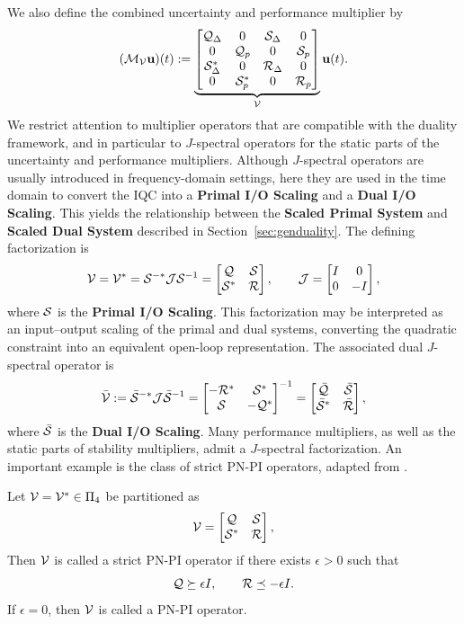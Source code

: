 We also define the combined uncertainty and performance multiplier by
\begin{equation*}
	(\mathcal{M}_{\mathcal{V}}\mathbf{u})(t):=\underbrace{\begin{bmatrix}\mathcal{Q}_\Delta & 0 & \mathcal{S}_\Delta & 0 \\ 0 & \mathcal{Q}_p & 0 & \mathcal{S}_p \\ \mathcal{S}_\Delta^* & 0 & \mathcal{R}_\Delta & 0 \\ 0 & \mathcal{S}_p^* & 0 & \mathcal{R}_p\end{bmatrix}}_{\mathcal{V}}\mathbf{u}(t).
\end{equation*}
We restrict attention to multiplier operators that are compatible with the duality framework, and in particular to $J$-spectral operators for the static parts of the uncertainty and performance multipliers. Although $J$-spectral operators are usually introduced in frequency-domain settings, here they are used in the time domain to convert the IQC into a \textbf{Primal I/O Scaling} and a \textbf{Dual I/O Scaling}. This yields the relationship between the \textbf{Scaled Primal System} and \textbf{Scaled Dual System} described in Section~\ref{sec:genduality}. The defining factorization is
\begin{equation*}
	\mathcal{V}=\mathcal{V}^*=\mathcal{S}^{-*}\mathcal{J}\mathcal{S}^{-1}=\begin{bmatrix}\mathcal{Q} & \mathcal{S} \\ \mathcal{S}^* & \mathcal{R}\end{bmatrix}, \qquad \mathcal{J}=\begin{bmatrix}I & 0 \\ 0 & -I\end{bmatrix},
\end{equation*}
where $\mathcal{S}$ is the \textbf{Primal I/O Scaling}. This factorization may be interpreted as an input--output scaling of the primal and dual systems, 
converting the quadratic constraint into an equivalent open-loop representation. The associated dual $J$-spectral operator is
\begin{equation*}
	\bar{\mathcal{V}}:=\bar{\mathcal{S}}^{-*}\mathcal{J}\bar{\mathcal{S}}^{-1}=\begin{bmatrix}-\mathcal{R}^* & \mathcal{S}^* \\ \mathcal{S} & -\mathcal{Q}^*\end{bmatrix}^{-1}=\begin{bmatrix}\bar{\mathcal{Q}} & \bar{\mathcal{S}} \\ \bar{\mathcal{S}}^* & \bar{\mathcal{R}}\end{bmatrix},
\end{equation*}
where $\bar{\mathcal{S}}$ is the \textbf{Dual I/O Scaling}. Many performance multipliers, as well as the static parts of stability multipliers, admit a $J$-spectral factorization. An important example is the class of strict PN-PI operators, adapted from \cite{hu}.

\begin{definition}
	Let $\mathcal{V}=\mathcal{V}^*\in\Pi_4$ be partitioned as
	\begin{equation*}
		\mathcal{V}=\begin{bmatrix}\mathcal{Q} & \mathcal{S} \\ \mathcal{S}^* & \mathcal{R}\end{bmatrix},
	\end{equation*}
	Then $\mathcal{V}$ is called a strict PN-PI operator if there exists $\epsilon>0$ such that
	\begin{equation*}
		\mathcal{Q} \succeq \epsilon I, \qquad \mathcal{R} \preceq -\epsilon I.
	\end{equation*}
	If $\epsilon=0$, then $\mathcal{V}$ is called a PN-PI operator.
\end{definition}

